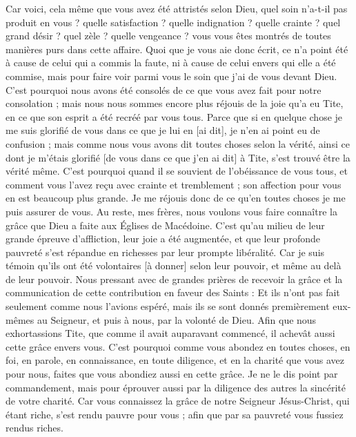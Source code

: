 \begin{multicols}{2}
Car voici, cela même que vous avez été attristés selon Dieu, quel soin n'a-t-il pas produit en vous ? quelle satisfaction ? quelle indignation ? quelle crainte ? quel grand désir ? quel zèle ? quelle vengeance ? vous vous êtes montrés de toutes manières purs dans cette affaire.
Quoi que je vous aie donc écrit, ce n'a point été à cause de celui qui a commis la faute, ni à cause de celui envers qui elle a été commise, mais pour faire voir parmi vous le soin que j'ai de vous devant Dieu.
C'est pourquoi nous avons été consolés de ce que vous avez fait pour notre consolation ; mais nous nous sommes encore plus réjouis de la joie qu'a eu Tite, en ce que son esprit a été recréé par vous tous.
Parce que si en quelque chose je me suis glorifié de vous dans ce que je lui en [ai dit], je n'en ai point eu de confusion ; mais comme nous vous avons dit toutes choses selon la vérité, ainsi ce dont je m'étais glorifié [de vous dans ce que j'en ai dit] à Tite, s'est trouvé être la vérité même.
C'est pourquoi quand il se souvient de l'obéissance de vous tous, et comment vous l'avez reçu avec crainte et tremblement ; son affection pour vous en est beaucoup plus grande.
Je me réjouis donc de ce qu'en toutes choses je me puis assurer de vous.
\VerseOne{}Au reste, mes frères, nous voulons vous faire connaître la grâce que Dieu a faite aux Églises de Macédoine.
C'est qu'au milieu de leur grande épreuve d'affliction, leur joie a été augmentée, et que leur profonde pauvreté s'est répandue en richesses par leur prompte libéralité.
Car je suis témoin qu'ils ont été volontaires [à donner] selon leur pouvoir, et même au delà de leur pouvoir.
Nous pressant avec de grandes prières de recevoir la grâce et la communication de cette contribution en faveur des Saints :
Et ils n'ont pas fait seulement comme nous l'avions espéré, mais ils se sont donnés premièrement eux-mêmes au Seigneur, et puis à nous, par la volonté de Dieu.
Afin que nous exhortassions Tite, que comme il avait auparavant commencé, il achevât aussi cette grâce envers vous.
C'est pourquoi comme vous abondez en toutes choses, en foi, en parole, en connaissance, en toute diligence, et en la charité que vous avez pour nous, faites que vous abondiez aussi en cette grâce.
Je ne le dis point par commandement, mais pour éprouver aussi par la diligence des autres la sincérité de votre charité.
Car vous connaissez la grâce de notre Seigneur Jésus-Christ, qui étant riche, s'est rendu pauvre pour vous ; afin que par sa pauvreté vous fussiez rendus riches.

\end{multicols}
